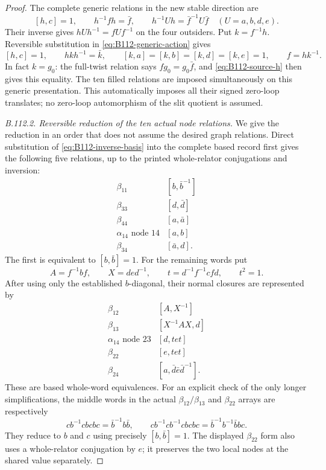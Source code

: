 \begin{proof}
The complete generic relations in the new stable direction are
\begin{equation}\label{eq:B112-generic-action}
 [h,c]=1,\qquad h^{-1}fh=\bar f,\qquad
 h^{-1}Uh=\bar f^{-1}U\bar f\quad(U=a,b,d,e).
\end{equation}
Their inverse gives $hUh^{-1}=fUf^{-1}$ on the four outsiders.
Put $k=f^{-1}h$. Reversible substitution in
\eqref{eq:B112-generic-action} gives
\begin{equation}\label{eq:B112-generic-k}
 [h,c]=1,\qquad hkh^{-1}=\bar k,\qquad
 [k,a]=[k,b]=[k,d]=[k,e]=1,
 \qquad f=hk^{-1}.
\end{equation}
In fact $k=g_0$: the full-twist relation says $fg_0=g_0\bar f$,
and \eqref{eq:B112-source-h} then gives this equality.
The ten filled relations are imposed simultaneously on this generic
presentation. This automatically imposes all their signed zero-loop
translates; no zero-loop automorphism of the slit quotient is assumed.

\emph{B.112.2. Reversible reduction of the ten actual node relations.}
We give the reduction in an order that does not assume the desired
graph relations. Direct substitution of
\eqref{eq:B112-inverse-basis} into the complete based record first
gives the following five relations, up to the printed whole-relator
conjugations and inversion:
\begin{equation}\label{eq:B112-first-five}
 \begin{array}{c|c}
 \beta_{11}&[b,\bar b^{-1}]\\
 \beta_{33}&[d,\bar d]\\
 \beta_{44}&[a,\bar a]\\
 \alpha_{14}\text{ node }14&[a,b]\\
 \beta_{34}&[\bar a,d].
 \end{array}
\end{equation}
The first is equivalent to $[b,\bar b]=1$.
For the remaining words put
\[
 A=f^{-1}bf,\qquad X=ded^{-1},\qquad
 t=d^{-1}f^{-1}cfd,\qquad t^2=1.
\]
After using only the established $b$-diagonal, their normal closures
are represented by
\begin{equation}\label{eq:B112-remaining-five}
 \begin{array}{c|c}
 \beta_{12}&[A,X^{-1}]\\
 \beta_{13}&[X^{-1}AX,d]\\
 \alpha_{14}\text{ node }23&[d,tet]\\
 \beta_{22}&[e,tet]\\
 \beta_{24}&[a,\bar d\bar e\bar d^{-1}].
 \end{array}
\end{equation}
These are based whole-word equivalences. For an explicit check of
the only longer simplifications, the middle words in the actual
$\beta_{12}/\beta_{13}$ and $\beta_{22}$ arrays are respectively
\[
 cb^{-1}cbcb c=\bar b^{-1}b\bar b,
 \qquad
 cb^{-1}cb^{-1}cbcb c=\bar b^{-1}b^{-1}\bar b b c.
\]
They reduce to $b$ and $c$ using precisely $[b,\bar b]=1$.
The displayed $\beta_{22}$ form also uses a whole-relator conjugation
by $e$; it preserves the two local nodes at the shared value separately.


\end{proof}
